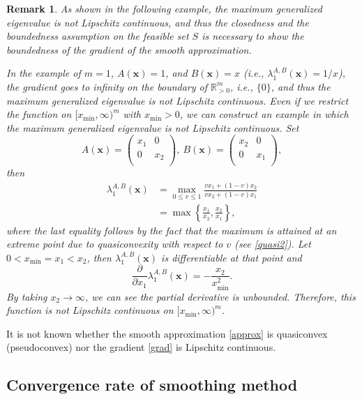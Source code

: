 \documentclass[sn-mathphys,Numbered]{sn-jnl}%
\theoremstyle{thmstyleone}%
\theoremstyle{thmstyletwo}%
\newtheorem{remark}{Remark}%
\theoremstyle{thmstylethree}%
\newcommand{\e}[1]{\begin{equation}#1\end{equation}}
\newcommand{\cur}[1]{\left\{#1\right\}}
\def\rm{\mathbb{R}^m}
\def\lamx{\lambda^{A,B}_1(\boldsymbol{x})}
\begin{document}
\begin{remark}
As shown in the following example, the maximum generalized eigenvalue is not Lipschitz continuous, and thus the closedness and the boundedness assumption on the feasible set $S$ is necessary to show the boundedness of the gradient of the smooth approximation.

In the example of $m=1$, $A(\bm{x})=1$, and $B(\bm{x})=x$ (i.e., $\lamx=1/x$), the gradient goes to infinity on the boundary of $\rm_{>0}$, i.e., $\{0\}$, and thus the maximum generalized eigenvalue is not Lipschitz continuous. Even if we restrict the function on $[x_\mathrm{min},\infty)^m$ with $x_\mathrm{min}>0$, we can construct an example in which the maximum generalized eigenvalue is not Lipschitz continuous. Set 
\e{
A(\bm{x})=\begin{pmatrix}
x_1 & 0 \\
0 & x_2 \\
\end{pmatrix},\ 
B(\bm{x})=\begin{pmatrix}
x_2 & 0 \\
0 & x_1 \\
\end{pmatrix},
}
then 
\begin{align}
\lamx
& = \underset{0\le v \le 1}{\max}\frac{v x_1+(1-v)x_2}{v x_2+(1-v)x_1}\\
& = \max\cur{\frac{x_1}{x_2},\frac{x_2}{x_1}},
\end{align}
where the last equality follows by the fact that the maximum is attained at an extreme point due to quasiconvexity with respect to $v$ (see \eqref{quasi2}). Let $0<x_\mathrm{min}=x_1<x_2$, then $\lamx$ is differentiable at that point and 
\e{
\frac{\partial}{\partial x_1}\lamx=-\frac{x_2}{x_\mathrm{min}^2}.
}
By taking $x_2\to\infty$, we can see the partial derivative is unbounded. Therefore, this function is not Lipschitz continuous on $[x_\mathrm{min},\infty)^m$.
\end{remark}

It is not known whether the smooth approximation \eqref{approx} is quasiconvex (pseudoconvex) nor the gradient \eqref{grad} is Lipschitz continuous.

\subsection{Convergence rate of smoothing method}
\end{document}
